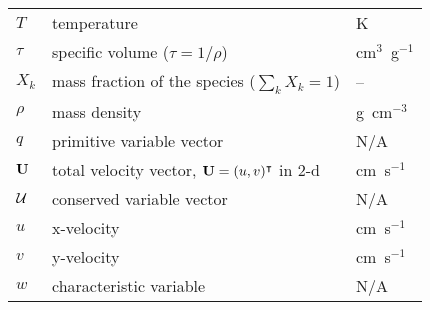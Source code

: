 \begin{center}
\begin{longtable}{|l|p{4.0in}|l|}
%
$T$     & temperature                                & K \\
%
$\tau$  & specific volume ($\tau = 1/\rho$)          & cm$^3$~g$^{-1}$ \\
%
$X_k$   & mass fraction of the species ($\sum_k X_k = 1$) & -- \\
%
$\rho$  & mass density  & g~cm$^{-3}$ \\
%
$q$     & primitive variable vector                 & N/A \\
%
${\bf U}$   & total velocity vector, ${\bf U} = (u, v)^\intercal$ in 2-d & cm~s$^{-1}$ \\
%
${\mathcal{U}}$ & conserved variable vector & N/A \\
%
$u$     & x-velocity   & cm~s$^{-1}$ \\
%
$v$     & y-velocity   & cm~s$^{-1}$ \\
%
$w$     & characteristic variable                   & N/A \\
%
\end{longtable}
\end{center}
\renewcommand{\arraystretch}{1.0}


